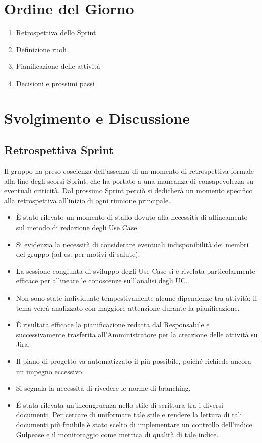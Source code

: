 \documentclass[a4paper,12pt]{article}
\begin{document}
\section{Ordine del Giorno}
\begin{enumerate}[noitemsep]
    \item Retrospettiva dello Sprint
    \item Definizione ruoli
    \item Pianificazione delle attività
    \item Decisioni e prossimi passi
\end{enumerate}


\section{Svolgimento e Discussione}

\subsection{Retrospettiva Sprint}
Il gruppo ha preso coscienza dell'assenza di un momento di retrospettiva formale alla fine degli scorsi Sprint, che ha portato a una mancanza di consapevolezza su eventuali criticità. Dal prossimo Sprint perciò si dedicherà un momento specifico alla retrospettiva all'inizio di ogni riunione principale.
\begin{itemize}[noitemsep]
    \item È stato rilevato un momento di stallo dovuto alla necessità di allineamento sul metodo di redazione degli Use Case.
    \item Si evidenzia la necessità di considerare eventuali indisponibilità dei membri del gruppo (ad es. per motivi di salute).
    \item La sessione congiunta di sviluppo degli Use Case si è rivelata particolarmente efficace per allineare le conoscenze sull'analisi degli UC.
    \item Non sono state individuate tempestivamente alcune dipendenze tra attività; il tema verrà analizzato con maggiore attenzione durante la pianificazione.
    \item È risultata efficace la pianificazione redatta dal Responsabile e successivamente trasferita all'Amministratore per la creazione delle attività su Jira.
    \item Il piano di progetto va automatizzato il più possibile, poiché richiede ancora un impegno eccessivo.
    \item Si segnala la necessità di rivedere le norme di branching.
    \item É stata rilevata un'incongruenza nello stile di scrittura tra i diversi documenti. Per cercare di uniformare tale stile e rendere la lettura di tali documenti più fruibile è stato scelto di implementare un controllo dell'indice Gulpease e il monitoraggio come metrica di qualità di tale indice.
\end{itemize}
\end{document}
